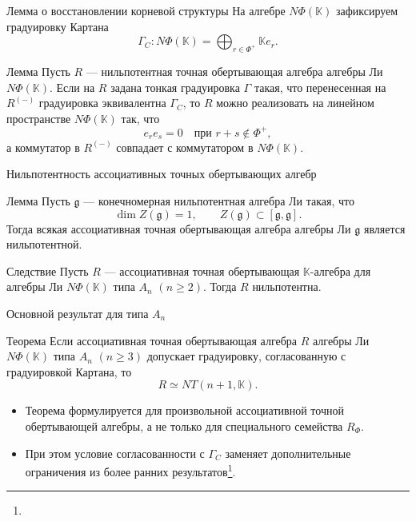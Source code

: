 \documentclass[12pt,aspectratio=169]{beamer}
\newcommand{\K}{\mathbb{K}}
\newcommand{\sourcefootnote}[1]{\footnote{\slidecite{#1}}}
\begin{document}
\begin{frame}[t]{Лемма о восстановлении корневой структуры}
    На алгебре $N\Phi(\mathbb{K})$ зафиксируем градуировку Картана
    \[
        \Gamma_C\colon N\Phi(\mathbb{K})=
        \bigoplus_{r\in\Phi^+}\mathbb{K}e_r.
    \]
    \begin{block}{Лемма}
        Пусть $R$ --- нильпотентная точная обертывающая алгебра алгебры Ли $N\Phi(\K)$. Если на $R$ задана тонкая градуировка $\Gamma$ такая, что перенесенная на $R^{(-)}$ градуировка эквивалентна $\Gamma_C$, то $R$ можно реализовать на линейном пространстве $N\Phi(\K)$ так, что
        \[
            e_r e_s=0\quad \text{при } r+s\notin\Phi^+,
        \]
        а коммутатор в $R^{(-)}$ совпадает с коммутатором в $N\Phi(\K)$.
    \end{block}
\end{frame}

\begin{frame}[t]{Нильпотентность ассоциативных точных обертывающих алгебр}
    \begin{block}{Лемма}
        Пусть $\mathfrak{g}$ --- конечномерная нильпотентная алгебра Ли такая, что
        \[
            \dim Z(\mathfrak{g})=1,\qquad Z(\mathfrak{g})\subset [\mathfrak{g},\mathfrak{g}].
        \]
        Тогда всякая ассоциативная точная обертывающая алгебра алгебры Ли $\mathfrak{g}$ является
        нильпотентной.
    \end{block}

    \begin{block}{Следствие}
        Пусть $R$ --- ассоциативная точная обертывающая $\K$-алгебра для алгебры Ли $N\Phi(\K)$ типа $A_n$ $(n\ge 2)$. Тогда $R$ нильпотентна.
    \end{block}
\end{frame}

\begin{frame}[t]{Основной результат для типа $A_n$}
    \begin{alertblock}{Теорема}
        Если ассоциативная точная обертывающая алгебра $R$ алгебры Ли
        $N\Phi(\K)$ типа $A_n$ $(n\ge 3)$ допускает градуировку, согласованную с
        градуировкой Картана, то
        \[
            R \simeq NT(n+1,\K).
        \]
    \end{alertblock}

    \begin{itemize}
        \item Теорема формулируется для произвольной ассоциативной точной обертывающей
              алгебры, а не только для специального семейства $R_\Phi$.
        \item При этом условие согласованности с $\Gamma_C$ заменяет дополнительные
              ограничения из более ранних результатов\sourcefootnote{imm2020,smj2023}.
    \end{itemize}
\end{frame}
\end{document}
